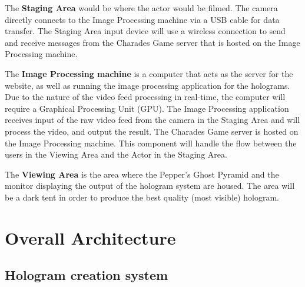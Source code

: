 The \textbf{Staging Area} would be where the actor would be filmed. The camera directly connects to the Image Processing machine via a USB cable for data transfer. The Staging Area input device will use a wireless connection to send and receive messages from the Charades Game server that is hosted on the Image Processing machine.

The \textbf{Image Processing machine} is a computer that acts as the server for the website, as well as running the image processing application for the holograms. Due to the nature of the video feed processing in real-time, the computer will require a Graphical Processing Unit (GPU). The Image Processing application receives input of the raw video feed from the camera in the Staging Area and will process the video, and output the result. The Charades Game server is hosted on the Image Processing machine. This component will handle the flow between the users in the Viewing Area and the Actor in the Staging Area.

The \textbf{Viewing Area} is the area where the Pepper's Ghost Pyramid and the monitor displaying the output of the hologram system are housed. The area will be a dark tent in order to produce the best quality (most visible) hologram.

\newpage


\section{Overall Architecture}
\subsection{Hologram creation system}

\begin{figure}[h!]
\end{figure}

